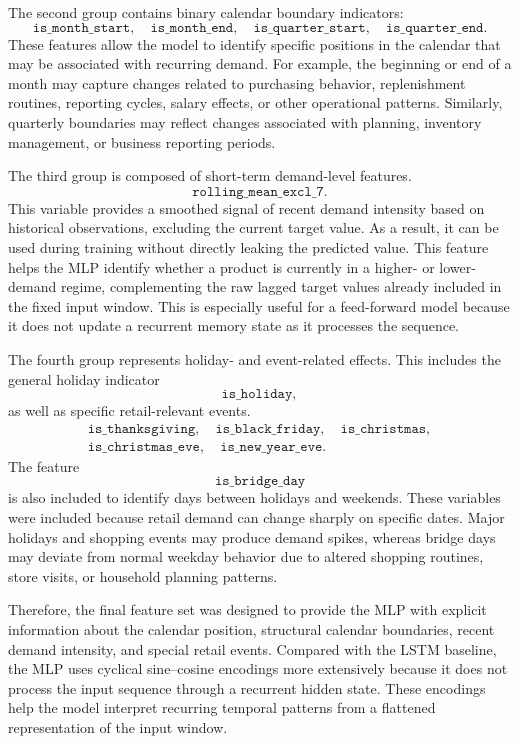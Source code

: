 The second group contains binary calendar boundary indicators:
\[
\texttt{is\_month\_start},\quad
\texttt{is\_month\_end},\quad
\texttt{is\_quarter\_start},\quad
\texttt{is\_quarter\_end}.
\]
These features allow the model to identify specific positions in the calendar that may be associated with recurring demand. For example, the beginning or end of a month may capture changes related to purchasing behavior, replenishment routines, reporting cycles, salary effects, or other operational patterns. Similarly, quarterly boundaries may reflect changes associated with planning, inventory management, or business reporting periods.

The third group is composed of short-term demand-level features.
\[
\texttt{rolling\_mean\_excl\_7}.
\]
This variable provides a smoothed signal of recent demand intensity based on historical observations, excluding the current target value. As a result, it can be used during training without directly leaking the predicted value. This feature helps the MLP identify whether a product is currently in a higher- or lower-demand regime, complementing the raw lagged target values already included in the fixed input window. This is especially useful for a feed-forward model because it does not update a recurrent memory state as it processes the sequence.

The fourth group represents holiday- and event-related effects. This includes the general holiday indicator
\[
\texttt{is\_holiday},
\]
as well as specific retail-relevant events.
\[
\begin{gathered}
\texttt{is\_thanksgiving},\quad
\texttt{is\_black\_friday},\quad
\texttt{is\_christmas},\\
\texttt{is\_christmas\_eve},\quad
\texttt{is\_new\_year\_eve}.
\end{gathered}
\]
The feature
\[
\texttt{is\_bridge\_day}
\]
is also included to identify days between holidays and weekends. These variables were included because retail demand can change sharply on specific dates. Major holidays and shopping events may produce demand spikes, whereas bridge days may deviate from normal weekday behavior due to altered shopping routines, store visits, or household planning patterns.

Therefore, the final feature set was designed to provide the MLP with explicit information about the calendar position, structural calendar boundaries, recent demand intensity, and special retail events. Compared with the LSTM baseline, the MLP uses cyclical sine--cosine encodings more extensively because it does not process the input sequence through a recurrent hidden state. These encodings help the model interpret recurring temporal patterns from a flattened representation of the input window.

